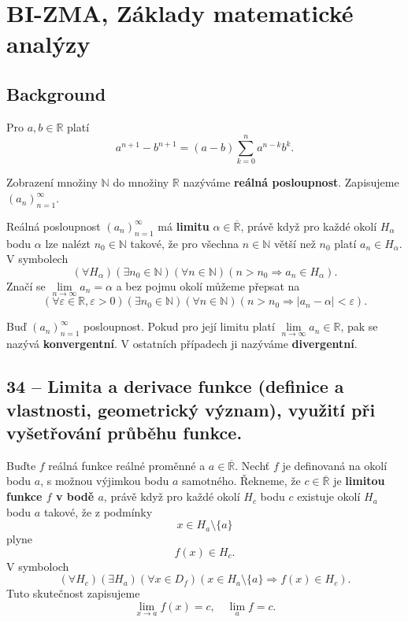 \chapter{BI-ZMA, Základy matematické analýzy}

\section{Background}

 Pro $a,b\in\mathbb{R}$ platí
$$
	a^{n+1}-b^{n+1}=(a-b)\sum_{k=0}^n a^{n-k}b^k.
$$

\label{def:posloupnost} Zobrazení množiny $\mathbb{N}$ do množiny $\mathbb{R}$ nazýváme \textbf{reálná posloupnost}. Zapisujeme $(a_n)_{n=1}^{\infty}$.

 Reálná posloupnost $(a_n)_{n=1}^{\infty}$ má \textbf{limitu} $\alpha\in\overline{\mathbb{R}}$, právě když pro každé okolí $H_{\alpha}$ bodu $\alpha$ lze nalézt $n_0 \in \mathbb{N}$ takové, že pro všechna $n\in\mathbb{N}$ větší než $n_0$ platí $a_n\in H_{\alpha}$. V symbolech
$$
	(\forall H_{\alpha})(\exists n_0 \in \mathbb{N})(\forall n\in\mathbb{N})(n>n_0 \Rightarrow a_n \in H_{\alpha}).
$$
Značí se $\lim\limits_{n\rightarrow\infty} a_n=\alpha$ a bez pojmu okolí můžeme přepsat na
$$
	(\forall \varepsilon\in\mathbb{R},\varepsilon >0)(\exists n_0 \in \mathbb{N})(\forall n\in\mathbb{N})(n>n_0 \Rightarrow |a_n-\alpha| < \varepsilon).
$$

\label{def:konvergence} Buď $(a_n )_{n=1}^{\infty}$ posloupnost. Pokud pro její limitu platí $\lim\limits_{n\rightarrow\infty} a_n \in\mathbb {R}$, pak se nazývá \textbf{konvergentní}. V ostatních případech ji nazýváme \textbf{divergentní}.

\section{34 -- Limita a derivace funkce (definice a vlastnosti, geometrický význam), využití při vyšetřování průběhu funkce.}

\label{def:limita} Buďte $f$ reálná funkce reálné proměnné a $a \in\overline{\mathbb{R}}$. Nechť $f$ je definovaná na okolí bodu $a$, s možnou výjimkou bodu $a$ samotného. Řekneme, že $c \in\overline{\mathbb{R}}$ je \textbf{limitou funkce $f$ v bodě $a$}, právě když pro každé okolí $H_c$ bodu $c$ existuje okolí $H_a$ bodu $a$ takové, že z podmínky
$$
	x\in H_a \setminus \{a\}
$$
plyne
$$
	f(x)\in H_c.
$$
V symboloch
$$
	(\forall H_c)(\exists H_a)(\forall x \in D_f)(x \in H_a \setminus \{a\} \Rightarrow f(x) \in H_c).
$$
Tuto skutečnost zapisujeme
$$
	\lim_{x\rightarrow a}f(x)=c,\quad \lim_a f=c.
$$

